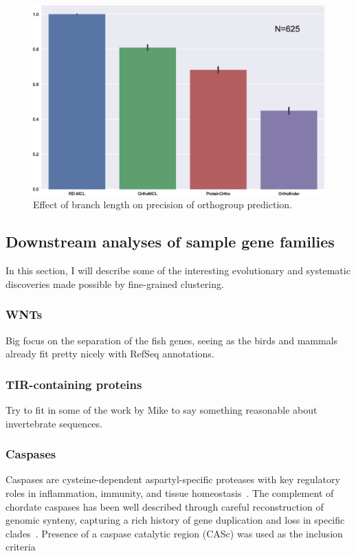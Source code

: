 \documentclass[twocolumn]{bmcart}  %
\begin{document}
\begin{figure}[t]
  \begin{center}
  \includegraphics[height=0.22\textheight]{../figures/branch_len_bargraph.eps}
\end{center}
\caption{Effect of branch length on precision of orthogroup prediction.}
\label{fig:branch_len_std}
\end{figure}


\subsection{Downstream analyses of sample gene families}\label{subsec:downstreamAnalysesOfSampleGeneFamilies}
In this section, I will describe some of the interesting evolutionary and systematic discoveries made possible by fine-grained clustering.


\subsubsection{WNTs}
Big focus on the separation of the fish genes, seeing as the birds and mammals already fit pretty nicely with RefSeq annotations.


\subsubsection{TIR-containing proteins}
Try to fit in some of the work by Mike to say something reasonable about invertebrate sequences.


\subsubsection{Caspases}
Caspases are cysteine-dependent aspartyl-specific proteases with key regulatory roles in inflammation, immunity, and tissue homeostasis~\cite{Songane:2018kq,McIlwain:2013iy}.
The complement of chordate caspases has been well described through careful reconstruction of genomic synteny, capturing a rich history of gene duplication and loss in specific clades~\cite{Eckhart:2008gv,Sakamaki:2009fu,Sakamaki:2015kb,Sakata:2007bs}.
Presence of a caspase catalytic region (CASc) was used as the inclusion criteria
\end{document}
